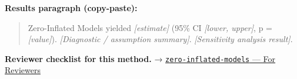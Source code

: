 \documentclass[
]{article}
\begin{document}
\textbf{Results paragraph (copy-paste):}

\begin{quote}
Zero-Inflated Models yielded \emph{{[}estimate{]}} (95\% CI
\emph{{[}lower, upper{]}}, p = \emph{{[}value{]}}). \emph{{[}Diagnostic
/ assumption summary{]}}. \emph{{[}Sensitivity analysis result{]}}.
\end{quote}

\textbf{Reviewer checklist for this method.} →
\href{../chapters/07-regression/zero-inflated-models.Rmd\#for-reviewers}{\texttt{zero-inflated-models}
--- For Reviewers}
\end{document}
